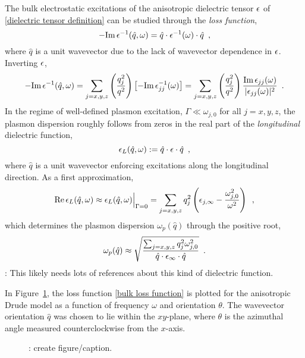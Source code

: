 The bulk electrostatic excitations of the anisotropic dielectric tensor $\epsilon$ of \eqref{dielectric tensor definition} can be studied through the {\it loss function},
\begin{equation}
    -\text{Im}\, \epsilon^{-1}(\hat q, \omega) = \hat q \cdot \epsilon^{-1}(\omega) \cdot \hat q
    \,\,\,,
\end{equation}
where $\hat q$ is a unit wavevector due to the lack of wavevector dependence in $\epsilon$.  Inverting $\epsilon$,
\begin{equation}
    \label{bulk loss function}
    -\text{Im}\,\epsilon^{-1}(\hat q, \omega) = \sum_{j=x,y,z} \left(\frac{q_j^2}{q^2}\right) \left[ -\text{Im}\,\epsilon_{jj}^{-1}(\omega)\right]
    =
    \sum_{j=x,y,z}\left(\frac{q_j^2}{q^2}\right)\frac{\text{Im}\,\epsilon_{jj}(\omega)}{|\epsilon_{jj}(\omega)|^2}
    \,\,\,.
\end{equation}
In the regime of well-defined plasmon excitation, $\Gamma \ll \omega_{j,0}$ for all $j=x,y,z$, the plasmon dispersion roughly follows from zeros in the real part of the {\it longitudinal} dielectric function,
\begin{equation}
    \epsilon_L(\hat q,\omega) :=\hat q\cdot \epsilon\cdot\hat q\,\,\,,
\end{equation}
where $\hat q$ is a unit wavevector enforcing excitations along the longitudinal direction.  As a first approximation,
\begin{equation}
    \label{longitudinal dielectric function without damping}
    \text{Re}\,\epsilon_L(\hat q, \omega) \approx \epsilon_L(\hat q, \omega)\Big|_{\Gamma = 0}
    =
    \sum_{j=x,y,z}q_j^2\left(\epsilon_{j,\infty} - \frac{\omega_{j,0}^2}{\omega^2}\right)
    \,\,\,,
\end{equation}
which determines the plasmon dispersion $\omega_p(\hat q)$ through the positive root,
\begin{equation}
    \omega_p(\hat q) \approx 
    \sqrt{\frac{\sum_{j=x,y,z}q_j^2 \omega_{j,0}^2}{\hat q \cdot \epsilon_{\infty} \cdot \hat q}}
    \,\,\,.
\end{equation}
: This likely needs lots of references about this kind of dielectric function.

In Figure~\ref{figure: anisotropic plasmon spectrum}, the loss function \eqref{bulk loss function} is plotted for the anisotropic Drude model as a function of frequency $\omega$ and orientation $\theta$.  The wavevector orientation $\hat q$ was chosen to lie within the $xy$-plane, where $\theta$ is the azimuthal angle measured counterclockwise from the $x$-axis.  

\begin{figure}
    \centering
    \caption{
        : create figure/caption.
    }
    \label{figure: anisotropic plasmon spectrum}
\end{figure}
